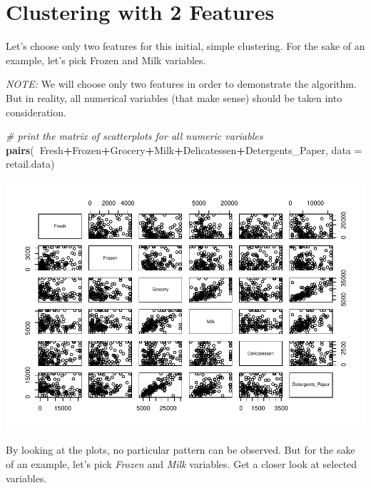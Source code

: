 \documentclass[]{article}
\newenvironment{Shaded}{\begin{snugshade}}{\end{snugshade}}
\newcommand{\KeywordTok}[1]{\textcolor[rgb]{0.13,0.29,0.53}{\textbf{#1}}}
\newcommand{\DataTypeTok}[1]{\textcolor[rgb]{0.13,0.29,0.53}{#1}}
\newcommand{\CommentTok}[1]{\textcolor[rgb]{0.56,0.35,0.01}{\textit{#1}}}
\newcommand{\OperatorTok}[1]{\textcolor[rgb]{0.81,0.36,0.00}{\textbf{#1}}}
\newcommand{\NormalTok}[1]{#1}
\begin{document}
\section{Clustering with 2 Features}\label{clustering-with-2-features}

Let's choose only two features for this initial, simple clustering. For
the sake of an example, let's pick Frozen and Milk variables.

\emph{NOTE:} We will choose only two features in order to demonstrate
the algorithm. But in reality, all numerical variables (that make sense)
should be taken into consideration.

\begin{Shaded}
\begin{Highlighting}[]
\CommentTok{# print the matrix of scatterplots for all numeric variables}
\KeywordTok{pairs}\NormalTok{(}\OperatorTok{~}\NormalTok{Fresh}\OperatorTok{+}\NormalTok{Frozen}\OperatorTok{+}\NormalTok{Grocery}\OperatorTok{+}\NormalTok{Milk}\OperatorTok{+}\NormalTok{Delicatessen}\OperatorTok{+}\NormalTok{Detergents_Paper, }\DataTypeTok{data =}\NormalTok{ retail.data)}
\end{Highlighting}
\end{Shaded}

\begin{center}\includegraphics{7._K-means_Clustering_files/figure-latex/unnamed-chunk-20-1} \end{center}

By looking at the plots, no particular pattern can be observed. But for
the sake of an example, let's pick \emph{Frozen} and \emph{Milk}
variables. Get a closer look at selected variables.
\end{document}
